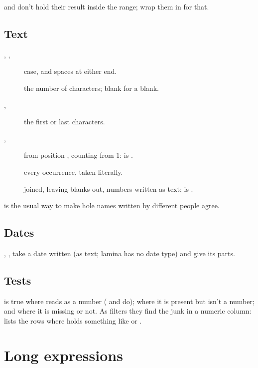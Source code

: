  and  don't hold their result inside the range; wrap them in  for
that.

\subsection{Text}

\begin{description}
\item[, , ] case, and spaces at either end.
\item[] the number of characters; blank for a blank.
\item[, ] the first or last  characters.
\item[, ] from position , counting from 1:
 is .
\item[] every occurrence, taken literally.
\item[] joined, leaving blanks out, numbers written as text:
 is .
\end{description}

 is the usual way to make hole names written by different people agree.

\subsection{Dates}

, ,  take a date written  (as text; lamina has
no date type) and give its parts.

\subsection{Tests}

 is true where  reads as a number ( and  do);
 where it is present but isn't a number;  and  where
it is missing or not. As filters they find the junk in a numeric column:  lists the
rows where  holds something like  or .

\section{Long expressions}\label{sec:comments}

